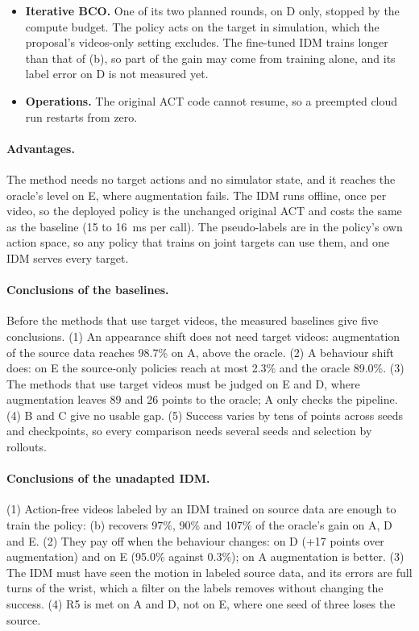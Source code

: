 \documentclass{article}
\begin{document}
\begin{itemize}
  \citep{nejjar2023daregram}. Here DANN raised mostly the wrist error, in every phase
  (Section~\ref{sec:dann}), as a constant offset. Our DANN result has one training seed,
  its settings were fixed and not tuned (R1), and its cause, target images in the batches
  changing the weights, is shown on that seed only.
  \item \textbf{Iterative BCO.} One of its two planned rounds, on D only, stopped by the
  compute budget. The policy acts on the target in simulation, which the proposal's
  videos-only setting excludes. The fine-tuned IDM trains longer than that of (b), so part
  of the gain may come from training alone, and its label error on D is not measured yet.
  \item \textbf{Operations.} The original ACT code cannot resume, so a preempted cloud
  run restarts from zero.
\end{itemize}

\paragraph{Advantages.}
The method needs no target actions and no simulator state, and it reaches the oracle's
level on E, where augmentation fails. The IDM runs offline, once per video, so the
deployed policy is the unchanged original ACT and costs the same as the baseline (15 to
16~ms per call). The pseudo-labels are in the policy's own action space, so any policy
that trains on joint targets can use them, and one IDM serves every target.

\paragraph{Conclusions of the baselines.}
Before the methods that use target videos, the measured baselines give five conclusions.
(1) An appearance shift does not need target videos: augmentation of the source data
reaches 98.7\% on A, above the oracle. (2) A behaviour shift does: on E the source-only
policies reach at most 2.3\% and the oracle 89.0\%. (3) The methods that use target
videos must be judged on E and D, where augmentation leaves 89 and 26 points to the
oracle; A only checks the pipeline. (4) B and C give no usable gap. (5) Success varies by
tens of points across seeds and checkpoints, so every comparison needs several seeds and
selection by rollouts.

\paragraph{Conclusions of the unadapted IDM.}
(1) Action-free videos labeled by an IDM trained on source data are enough to train the
policy: (b) recovers 97\%, 90\% and 107\% of the oracle's gain on A, D and E. (2) They pay
off when the behaviour changes: on D (+17 points over augmentation) and on E (95.0\%
against 0.3\%); on A augmentation is better. (3) The IDM must have seen the motion in
labeled source data, and its errors are full turns of the wrist, which a filter on the
labels removes without changing the success. (4) R5 is met on A and D, not on E, where one
seed of three loses the source.
\end{document}
